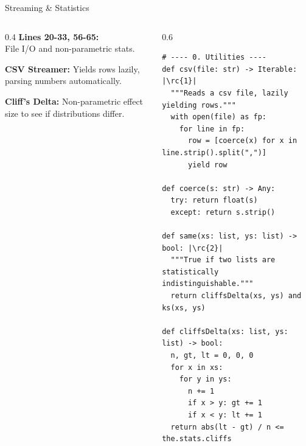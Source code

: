 \begin{frame}[fragile]{Streaming \& Statistics}
\begin{columns}[T]
  \begin{column}{0.4\textwidth}
    \footnotesize 
    \textbf{Lines 20-33, 56-65:}\\
    File I/O and non-parametric stats.

    \vspace{0.2cm}
     \textbf{CSV Streamer:} Yields rows lazily, parsing numbers automatically.
    
    \vspace{0.15cm}
     \textbf{Cliff's Delta:} Non-parametric effect size to see if distributions differ.
  \end{column}
  
  \begin{column}{0.6\textwidth}
\begin{verbatim}
# ---- 0. Utilities ----
def csv(file: str) -> Iterable: |\rc{1}|
  """Reads a csv file, lazily yielding rows."""
  with open(file) as fp:
    for line in fp:
      row = [coerce(x) for x in line.strip().split(",")]
      yield row

def coerce(s: str) -> Any:
  try: return float(s)
  except: return s.strip()

def same(xs: list, ys: list) -> bool: |\rc{2}|
  """True if two lists are statistically indistinguishable."""
  return cliffsDelta(xs, ys) and ks(xs, ys)

def cliffsDelta(xs: list, ys: list) -> bool:
  n, gt, lt = 0, 0, 0
  for x in xs:
    for y in ys:
      n += 1
      if x > y: gt += 1
      if x < y: lt += 1
  return abs(lt - gt) / n <= the.stats.cliffs
\end{verbatim}
  \end{column}
\end{columns}
\end{frame}

